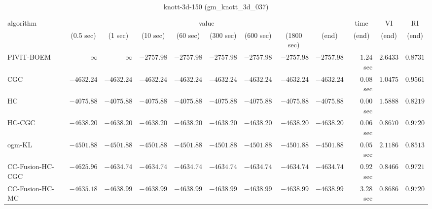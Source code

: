 \begin{table}[H]
\scriptsize
\centering
\caption{knott-3d-150 (gm\_knott\_3d\_037)}
\label{tab:anytimetable-knott-3d-150-gm-knott-3d-037}
\begin{tabular}{lrrrrrrrrrrr}
\toprule
           algorithm &                                   \multicolumn{8}{c}{value} & \multicolumn{1}{c}{time}    & \multicolumn{1}{c}{VI}  & \multicolumn{1}{c}{RI} \\  
\cmidrule(lr){2-9}\cmidrule(lr){10-10} \cmidrule(lr){11-11} \cmidrule(lr){12-12}   
                     & \multicolumn{1}{c}{(0.5 sec)} & \multicolumn{1}{c}{(1 sec)} & \multicolumn{1}{c}{(10 sec)} & \multicolumn{1}{c}{(60 sec)} & \multicolumn{1}{c}{(300 sec)} & \multicolumn{1}{c}{(600 sec)} & \multicolumn{1}{c}{(1800 sec)} & \multicolumn{1}{c}{(end)} & \multicolumn{1}{c}{(end)}    & \multicolumn{1}{c}{(end)}   & \multicolumn{1}{c}{(end)}  \\ \midrule 
          PIVIT-BOEM & $\infty$ & $\infty$ & $     -2757.98$ & $     -2757.98$ & $     -2757.98$ & $     -2757.98$ & $     -2757.98$ & $     -2757.98$ & $         1.24$ sec    & $       2.6433$  & $       0.8731$ \\ 
                 CGC & $     -4632.24$ & $     -4632.24$ & $     -4632.24$ & $     -4632.24$ & $     -4632.24$ & $     -4632.24$ & $     -4632.24$ & $     -4632.24$ & $         0.08$ sec    & $       1.0475$  & $       0.9561$ \\ 
                  HC & $     -4075.88$ & $     -4075.88$ & $     -4075.88$ & $     -4075.88$ & $     -4075.88$ & $     -4075.88$ & $     -4075.88$ & $     -4075.88$ & $         0.00$ sec    & $       1.5888$  & $       0.8219$ \\ 
              HC-CGC & $     -4638.20$ & $     -4638.20$ & $     -4638.20$ & $     -4638.20$ & $     -4638.20$ & $     -4638.20$ & $     -4638.20$ & $     -4638.20$ & $         0.06$ sec    & $       0.8670$  & $       0.9720$ \\ 
              ogm-KL & $     -4501.88$ & $     -4501.88$ & $     -4501.88$ & $     -4501.88$ & $     -4501.88$ & $     -4501.88$ & $     -4501.88$ & $     -4501.88$ & $         0.05$ sec    & $       2.1186$  & $       0.8513$ \\ 
    CC-Fusion-HC-CGC & $     -4625.96$ & $     -4634.74$ & $     -4634.74$ & $     -4634.74$ & $     -4634.74$ & $     -4634.74$ & $     -4634.74$ & $     -4634.74$ & $         0.92$ sec    & $       0.8466$  & $       0.9721$ \\ 
     CC-Fusion-HC-MC & $     -4635.18$ & $     -4638.99$ & $     -4638.99$ & $     -4638.99$ & $     -4638.99$ & $     -4638.99$ & $     -4638.99$ & $     -4638.99$ & $         3.28$ sec    & $       0.8686$  & $       0.9720$ \\ 

\end{tabular}
\end{table}

